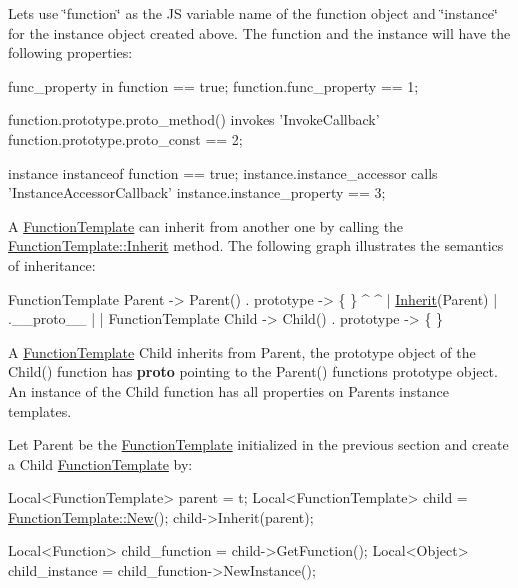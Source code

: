 Let\textquotesingle{}s use \char`\"{}function\char`\"{} as the J\+S variable name of the function object and \char`\"{}instance\char`\"{} for the instance object created above. The function and the instance will have the following properties\+:


\begin{DoxyCode}
func\_property in \textcolor{keyword}{function} == \textcolor{keyword}{true};
\textcolor{keyword}{function}.func\_property == 1;

\textcolor{keyword}{function}.prototype.proto\_method() invokes \textcolor{stringliteral}{'InvokeCallback'}
\textcolor{keyword}{function}.prototype.proto\_const == 2;

instance instanceof \textcolor{keyword}{function} == \textcolor{keyword}{true};
instance.instance\_accessor calls \textcolor{stringliteral}{'InstanceAccessorCallback'}
instance.instance\_property == 3;
\end{DoxyCode}


A \hyperlink{classv8_1_1FunctionTemplate}{Function\+Template} can inherit from another one by calling the \hyperlink{classv8_1_1FunctionTemplate_abc11c462facf11bafd541892815c5425}{Function\+Template\+::\+Inherit} method. The following graph illustrates the semantics of inheritance\+:


\begin{DoxyCode}
FunctionTemplate Parent  -> Parent() . prototype -> \{ \}
  ^                                                  ^
  | \hyperlink{classv8_1_1FunctionTemplate_abc11c462facf11bafd541892815c5425}{Inherit}(Parent)                                  | .\_\_proto\_\_
  |                                                  |
FunctionTemplate Child   -> Child()  . prototype -> \{ \}
\end{DoxyCode}


A \hyperlink{classv8_1_1FunctionTemplate}{Function\+Template} \textquotesingle{}Child\textquotesingle{} inherits from \textquotesingle{}Parent\textquotesingle{}, the prototype object of the Child() function has {\bfseries proto} pointing to the Parent() function\textquotesingle{}s prototype object. An instance of the Child function has all properties on Parent\textquotesingle{}s instance templates.

Let Parent be the \hyperlink{classv8_1_1FunctionTemplate}{Function\+Template} initialized in the previous section and create a Child \hyperlink{classv8_1_1FunctionTemplate}{Function\+Template} by\+:


\begin{DoxyCode}
Local<FunctionTemplate> parent = t;
Local<FunctionTemplate> child = \hyperlink{classv8_1_1FunctionTemplate_a3c6a525ee4e0d72afa77be8e34861f83}{FunctionTemplate::New}();
child->Inherit(parent);

Local<Function> child\_function = child->GetFunction();
Local<Object> child\_instance = child\_function->NewInstance();
\end{DoxyCode}


